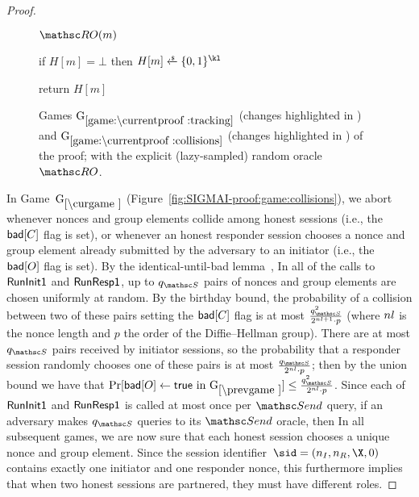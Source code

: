 \begin{proof}
\begin{collectinmacro}{\SIGMIProofTrackingCollisions}{}{}
\begin{figure}[tp]
\begin{minipage}[t]{0.49\textwidth}
\begin{algorithm}[start=101]{$\RO(m)$}
	\item if $H[m] = \bot$ then $H[m] \sample \bits^{\kl}$
	\item return $H[m]$
\end{algorithm}
	\end{minipage}

	\caption[]{%
		Games $\lblGm{tracking}$ (changes highlighted in ) and $\lblGm{collisions}$ (changes highlighted in ) of the \SIGMAI proof;
		with the explicit (lazy-sampled) random oracle~$\RO$.
	}
	\label{fig:SIGMAI-proof:game:tracking}
	\label{fig:SIGMAI-proof:game:collisions}

  	\iffull\else %
	\label{apxfig:SIGMAI-proof:tracking--collisions}
	\fi
\end{figure}
\end{collectinmacro}

\iffull %
\SIGMIProofTrackingCollisions
\fi


\proofngame[collisions]

In Game~$\curGm$ (Figure~\ref{fig:SIGMAI-proof:game:collisions}\iffull{}\fi), we abort whenever nonces and group elements collide among honest sessions (i.e., the~$\mathsf{bad}[C]$ flag is set), or whenever an honest responder session chooses a nonce and group element already submitted by the adversary to an initiator (i.e., the~$\mathsf{bad}[O]$ flag is set).
By the identical-until-bad lemma~\cite{EC:BelRog06},
In all of the calls to $\mathsf{RunInit1}$ and $\mathsf{RunResp1}$, up to $\qSend$ pairs of nonces and group elements are chosen uniformly at random. By the birthday bound, the probability of a collision between two of these pairs setting the $\mathsf{bad}[C]$ flag is at most $\frac{\qSend^2}{2^{\nl+1}\cdot p}$ (where $nl$ is the nonce length and $p$ the order of the Diffie--Hellman group).
There are at most $\qSend$ pairs received by initiator sessions, so the probability that a responder session randomly chooses one of these pairs is at most $\frac{\qSend}{2^{\nl}\cdot p}$; then by the union bound we have that 
$\Pr[\bad[O] \gets \true \text{ in } \prevGm*] \leq \frac{\qSend^2}{2^{\nl}\cdot p}$.
Since each of $\mathsf{RunInit1}$ and $\mathsf{RunResp1}$ is called at most once per $\Send$ query, if an adversary makes $\qSend$ queries to its $\Send$ oracle, then 
In all subsequent games, we are now sure that each honest session chooses a unique nonce and group element.
Since the session identifier~$\sid = (\nonce_I, \nonce_R, \X, \Y)$ contains exactly one initiator and one responder nonce,
this furthermore implies that when two honest sessions are partnered, they must have different roles.



\end{proof}
